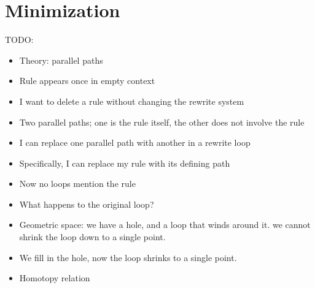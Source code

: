 \documentclass[../generics]{subfiles}
\begin{document}
\chapter[]{Minimization}\label{chap:minimization}

\ifWIP
TODO:
\begin{itemize}
\item Theory: parallel paths
\item Rule appears once in empty context
\item I want to delete a rule without changing the rewrite system
\item Two parallel paths; one is the rule itself, the other does not involve the rule
\item I can replace one parallel path with another in a rewrite loop
\item Specifically, I can replace my rule with its defining path
\item Now no loops mention the rule
\item What happens to the original loop?
\item Geometric space: we have a hole, and a loop that winds around it. we cannot shrink the loop down to a single point.
\item We fill in the hole, now the loop shrinks to a single point.
\item Homotopy relation
\end{itemize}


\fi

\ifWIP
\end{document}
